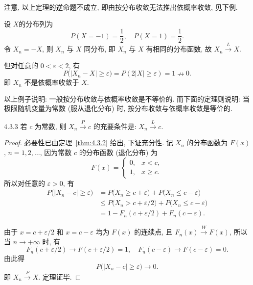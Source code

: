 注意, 以上定理的逆命题不成立, 即由按分布收敛无法推出依概率收敛, 见下例.

\begin{example}\label{exam:4.3.2}
    设 $ X $的分布列为
    \begin{equation*}
        P ( X = -1 ) = \frac{1}{2}, \quad P ( X = 1) = \frac{1}{2}.
    \end{equation*}
    令 $ X_n = -X $, 则 $ X_n $ 与 $ X $ 同分布, 即 $ X_n $ 与 $ X $ 有相同的分布函数, 故 $ X_n \stackrel{L}{\to} X $.

    但对任意的 $ 0 < \varepsilon < 2 $, 有
    \begin{equation*}
        P \bigl( \bigl\lvert X_n - X \bigr\rvert \geq \varepsilon \bigr) = P ( 2 \lvert X \rvert \geq \varepsilon ) = 1 \nrightarrow 0.
    \end{equation*}
    即 $ X_n $ 不是依概率收敛于 $ X $.
\end{example}

以上例子说明: 一般按分布收敛与依概率收敛是不等价的.
而下面的定理则说明: 当极限随机变量为常数 (服从退化分布) 时, 按分布收敛与依概率收敛是等价的.

\begin{theorem}{}{4.3.3}
    若 $ c $ 为常数, 则 $ X_n \stackrel{P}{\to} c $ 的充要条件是: $ X_n \stackrel{L}{\to} c $.
\end{theorem}

\begin{proof}
    必要性已由定理~\ref{thm:4.3.2} 给出, 下证充分性.
    记 $ X_n $ 的分布函数为 $ F (x) $, $ n = 1, 2, \dotsc $, 因为常数 $ c $ 的分布函数 (退化分布) 为
    \begin{equation*}
        F (x) =
        \begin{cases}
            0, & x < c,\\
            1, & x \geq c.
        \end{cases}
    \end{equation*}
    所以对任意的 $ \varepsilon > 0 $, 有
    \begin{align*}
        P \big( \big\lvert X_n - c \bigr\rvert \geq \varepsilon \bigr)
        & = P \bigl( X_n \geq c + \varepsilon \bigr) + P \bigl( X_n \leq c - \varepsilon \bigr)\\
        & \leq P \bigl( X_n > c + \varepsilon / 2 \bigr) + P \bigl( X_n \leq c - \varepsilon \bigr)\\
        & = 1 - F_n ( c + \varepsilon / 2 ) + F_n ( c - \varepsilon ).
    \end{align*}

    由于 $ x = c + \varepsilon / 2 $ 和 $ x = c - \varepsilon $ 均为 $ F (x) $ 的连续点, 且 $ F_n (x) \stackrel{W}{\to} F (x) $, 所以当 $ n \to +\infty $ 时, 有
    \begin{equation*}
        F_n ( c + \varepsilon / 2 ) \to F ( c + \varepsilon / 2 ) = 1, \quad F_n ( c - \varepsilon) \to F ( c - \varepsilon ) = 0.
    \end{equation*}
    由此得
    \begin{equation*}
        P \bigl( \bigl\lvert X_n - c \bigr\rvert \geq \varepsilon \bigr) \to 0. 
    \end{equation*}
    即 $ X_n \stackrel{P}{\to} X $.
    定理证毕.
\end{proof}

